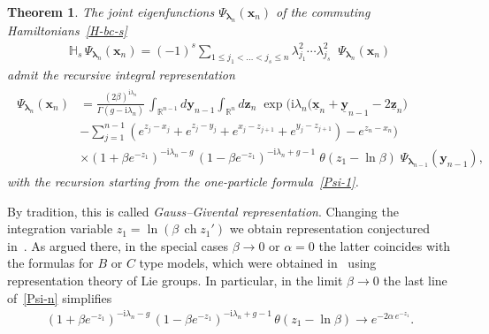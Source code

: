 \documentclass[11pt]{article}
\numberwithin{equation}{section}
\theoremstyle{plain}
\newtheorem{theorem}{Theorem}
\theoremstyle{definition}
\DeclareMathOperator{\ch}{ch}
\renewcommand{\imath}{\mathrm{i}}
\begin{document}
\begin{theorem}
	The joint eigenfunctions $\Psi_{\bm{\lambda}_n}(\bm{x}_n)$ of the commuting Hamiltonians~\eqref{H-bc-s}
	\begin{align}
		\mathbb{H}_{s} \, \Psi_{\bm{\lambda}_n}(\bm{x}_n) = (-1)^s  \sum_{1 \leq j_1 < \ldots < j_s \leq n} \lambda_{j_1}^2 \cdots \lambda_{j_s}^2 \;\; \Psi_{\bm{\lambda}_n}(\bm{x}_n) 
	\end{align}
	admit the recursive integral representation 
	\begin{align} \label{Psi-n}
		\begin{aligned}
			\Psi_{\bm{\lambda}_n}(\bm{x}_n) & = \frac{(2\beta)^{\imath \lambda_n}}{\Gamma ( g - \imath \lambda_n )} \, \int_{\mathbb{R}^{n - 1}}  d\bm{y}_{n - 1} \int_{\mathbb{R}^{n}} d\bm{z}_{n} \; \exp \biggl( \imath \lambda_n \bigl( \underline{\bm{x}}_n + \underline{\bm{y}}_{n - 1} - 2 \underline{\bm{z}}_{n} \bigr) \\[6pt]
			&  - \sum_{j = 1}^{n - 1} (e^{z_j - x_j} + e^{z_j - y_j} + e^{x_j - z_{j + 1}} + e^{y_j - z_{j + 1}} ) - e^{z_{n} - x_{n}}\biggr) \\[6pt]
			&  \times (1 + \beta e^{-z_1})^{- \imath \lambda_n - g} \, (1 - \beta e^{-z_1})^{- \imath \lambda_n + g - 1 } \; \theta(z_1 - \ln \beta) \; \Psi_{\bm{\lambda}_{n - 1}}(\bm{y}_{n - 1}),
		\end{aligned}
	\end{align}
	with the recursion starting from the one-particle formula~\eqref{Psi-1}.
\end{theorem}

By tradition, this is called \textit{Gauss--Givental representation}. Changing the integration variable $z_1 = \ln (\beta \, \ch z_1')$ we obtain representation conjectured in~\cite[Conjecture 1.2]{GLO2}. As argued there, in the special cases $\beta \to 0$ or $\alpha = 0$  the latter coincides with the formulas for $B$ or $C$ type models, which were obtained in~\cite{GLO1} using representation theory of Lie groups. In particular, in the limit $\beta \to 0$ the last line of~\eqref{Psi-n} simplifies
\begin{align}
	(1 + \beta e^{-z_1})^{- \imath \lambda_n - g} \, (1 - \beta e^{-z_1})^{- \imath \lambda_n + g - 1 } \, \theta(z_1 - \ln \beta) \to e^{- 2\alpha \, e^{-z_1}}.
\end{align}
\end{document}
